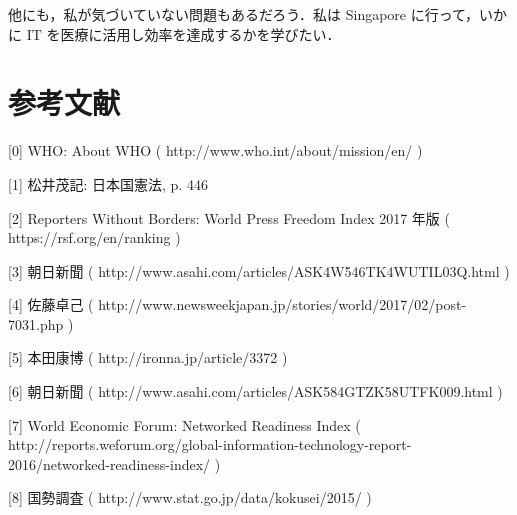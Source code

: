 \documentclass[10pt,uplatex]{jsarticle}
\begin{document}
他にも，私が気づいていない問題もあるだろう．私は Singapore に行って，いかに IT を医療に活用し効率を達成するかを学びたい．

\section*{参考文献}

[0] WHO: About WHO ( http://www.who.int/about/mission/en/ )

[1] 松井茂記: 日本国憲法, p. 446

[2] Reporters Without Borders: World Press Freedom Index 2017 年版 ( https://rsf.org/en/ranking )

[3] 朝日新聞 ( http://www.asahi.com/articles/ASK4W546TK4WUTIL03Q.html )

[4] 佐藤卓己  ( http://www.newsweekjapan.jp/stories/world/2017/02/post-7031.php )

[5] 本田康博  ( http://ironna.jp/article/3372 )

[6] 朝日新聞 (  http://www.asahi.com/articles/ASK584GTZK58UTFK009.html )

[7] World Economic Forum: Networked Readiness Index ( http://reports.weforum.org/global-information-technology-report-2016/networked-readiness-index/ )

[8] 国勢調査 ( http://www.stat.go.jp/data/kokusei/2015/ )
\end{document}
